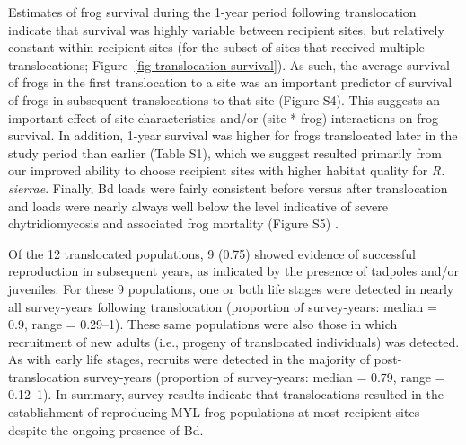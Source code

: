 \documentclass[9pt,twocolumn,twoside,lineno]{pnas-new}
\begin{document}
Estimates of frog survival during the 1-year period following
translocation indicate that survival was highly variable between
recipient sites, but relatively constant within recipient sites (for the
subset of sites that received multiple translocations;
Figure~\ref{fig-translocation-survival}). As such, the average survival
of frogs in the first translocation to a site was an important predictor
of survival of frogs in subsequent translocations to that site
(Figure S4). This suggests an important
effect of site characteristics and/or (site * frog) interactions on frog
survival. In addition, 1-year survival was higher for frogs translocated
later in the study period than earlier
(Table S1), which we suggest resulted
primarily from our improved ability to choose recipient sites with
higher habitat quality for \emph{R. sierrae}. Finally, Bd loads were
fairly consistent before versus after translocation and loads were
nearly always well below the level indicative of severe chytridiomycosis
and associated frog mortality (Figure S5)
\citep{joseph2018, vredenburg2010}.

Of the 12 translocated populations, 9 (0.75) showed evidence of
successful reproduction in subsequent years, as indicated by the
presence of tadpoles and/or juveniles. For these 9 populations, one or
both life stages were detected in nearly all survey-years following
translocation (proportion of survey-years: median = 0.9, range =
0.29--1). These same populations were also those in which recruitment of
new adults (i.e., progeny of translocated individuals) was detected. As
with early life stages, recruits were detected in the majority of
post-translocation survey-years (proportion of survey-years: median =
0.79, range = 0.12--1). In summary, survey results indicate that
translocations resulted in the establishment of reproducing MYL frog
populations at most recipient sites despite the ongoing presence of Bd.
\end{document}
